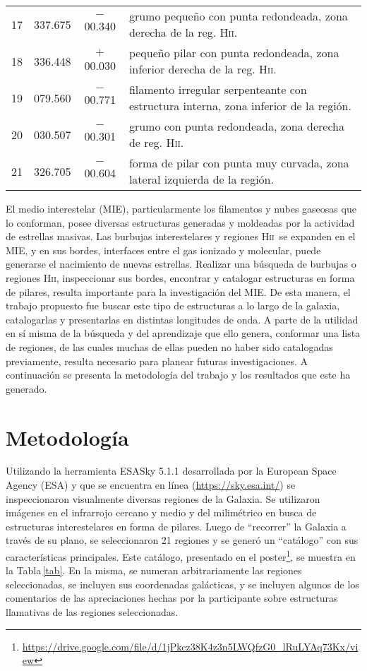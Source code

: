 \documentclass[baaa]{baaa}
\newcommand{\hii}{H\textsc{ii}}
\begin{document}
\begin{table*}
\begin{tabular}{cccl}
17	& 337.675	& $-$00.340 &	grumo pequeño con punta redondeada, zona derecha de la reg. \hii.\\
18	& 336.448	& $+$00.030  & pequeño pilar con punta redondeada, zona inferior derecha de la reg. \hii.\\
19	& 079.560	& $-$00.771 &	filamento irregular serpenteante con estructura interna, zona inferior de la región.\\
20	& 030.507	& $-$00.301 &	grumo con punta redondeada, zona derecha de reg. \hii.\\
21	& 326.705	& $-$00.604  & forma de pilar con punta muy curvada, zona lateral izquierda de la región.\\ 
\hline 
\end{tabular}
\end{table*}


El medio interestelar (MIE), particularmente los filamentos y nubes gaseosas que lo conforman, posee diversas estructuras generadas y moldeadas por la actividad
de estrellas masivas. Las burbujas interestelares y regiones \hii~se expanden en el MIE, y en sus bordes, interfaces entre el gas ionizado y molecular, puede generarse el nacimiento de nuevas estrellas. Realizar una búsqueda de burbujas o regiones \hii, inspeccionar sus bordes, encontrar y catalogar estructuras en forma de pilares, resulta importante para la investigación del MIE. De esta manera, el trabajo propuesto fue buscar este tipo de estructuras a lo largo de la galaxia, catalogarlas y presentarlas en distintas longitudes de onda. A parte de la utilidad en sí misma de la búsqueda y del aprendizaje que ello genera, conformar una lista de regiones, de las cuales muchas de ellas pueden no haber sido catalogadas previamente, resulta  necesario para planear futuras investigaciones. A continuación se presenta la metodología del trabajo y los resultados que este ha generado. 



\section{Metodología}

Utilizando la herramienta {\sc ESASky 5.1.1} desarrollada por la European Space Agency (ESA) y que se encuentra en línea (\url{https://sky.esa.int/}) se inspeccionaron visualmente diversas regiones de la Galaxia. Se utilizaron imágenes en el infrarrojo cercano y medio y del milimétrico en busca de estructuras interestelares en forma de pilares. 
Luego de ``recorrer'' la Galaxia a través de su plano, se seleccionaron 21 regiones y se generó un ``catálogo'' con sus características principales. Este catálogo, presentado en el  poster\footnote{\url{https://drive.google.com/file/d/1jPkcz38K4z3n5LWQfzG0_lRuLYAq73Kx/view}}, se muestra en la Tabla\,\ref{tab}. En la misma, se numeran arbitrariamente las regiones seleccionadas, se incluyen sus coordenadas galácticas, y se incluyen algunos de los comentarios de las apreciaciones hechas por la participante sobre estructuras llamativas de las regiones seleccionadas.
\end{document}
